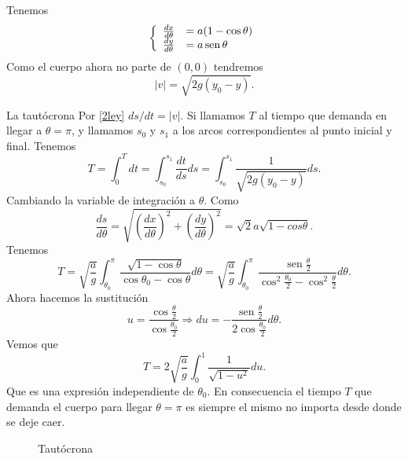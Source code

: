 \documentclass{article}
\DeclareMathOperator{\sen}{sen}
\begin{document}
  
  

 Tenemos
\[
 \left\{ \begin{array}{l l}
 \frac{dx}{d\theta}&=a(1-\cos\theta)\\
 \frac{dy}{d\theta}&=a\sen\theta 
 \end{array}\right.
\]
% 
Como el cuerpo ahora no parte de $(0,0)$ tendremos
\[|v|=\sqrt{2g(y_0-y)}.\]


  
  {La tautócrona}
Por \eqref{2ley} $ds/dt=|v|$. Si llamamos $T$ al tiempo que demanda en llegar a $\theta=\pi$, y llamamos  $s_0$ y $s_1$ a los arcos correspondientes al punto inicial
y final.  Tenemos
 \[T=\int_0^Tdt=\int_{s_0}^{s_1}\frac{dt}{ds}ds=\int_{s_0}^{s_1}\frac{1}{\sqrt{2g(y_0-y)}}ds.\]
Cambiando la variable de integración a $\theta$. Como 
\[
 \frac{ds}{d\theta}=\sqrt{\left(\frac{dx}{d\theta}\right)^2+\left(\frac{dy}{d\theta}\right)^2}=\sqrt{2}a\sqrt{1-cos\theta}.
\]
 Tenemos
\[T=\sqrt{\frac{a}{g}}\int_{\theta_0}^{\pi}\frac{\sqrt{1-\cos\theta}}{\cos\theta_0-\cos\theta}d\theta=
\sqrt{\frac{a}{g}}\int_{\theta_0}^{\pi}\frac{\sen\frac{\theta}{2}}{\cos^2\frac{\theta_0}{2}-\cos^2\frac{\theta}{2}}d\theta.
\]
Ahora hacemos la sustitución
\[u=\frac{\cos\frac{\theta}{2}}{\cos\frac{\theta_0}{2}}\Longrightarrow du=-\frac{\sen\frac{\theta}{2}}{2\cos\frac{\theta_0}{2}}d\theta.\]
Vemos que
\[
 T=2\sqrt{\frac{a}{g}}\int_0^1\frac{1}{\sqrt{1-u^2}}du.
\]
Que es una expresión independiente de $\theta_0$. En consecuencia el tiempo $T$ que demanda  el cuerpo para llegar $\theta=\pi$ es siempre el mismo no importa
desde donde se deje caer.

\begin{figure}[h]
\begin{center}
\end{center}\caption{Tautócrona}\label{fig:tautocrona}
\end{figure}
\end{document}
